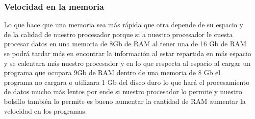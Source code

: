 \documentclass{article}
\begin{document}
\subsubsection{Velocidad en la memoria}
Lo que hace que una memoria sea más rápida que otra depende de su espacio y de la calidad de nuestro procesador porque si a nuestro procesador le cuesta procesar datos en una memoria de 8Gb de RAM al tener una de 16 Gb de RAM se podrá tardar más en encontrar la información al estar repartida en más espacio y se calentara más nuestro procesador y en lo que respecta al espacio al cargar un programa que ocupara 9Gb de RAM dentro de una memoria de 8 Gb el programa no cargara o utilizara 1 Gb del disco duro lo que hará el procesamiento de datos mucho más lentos por ende si nuestro procesador lo permite y nuestro bolsillo también lo permite es bueno aumentar la cantidad de RAM aumentar la velocidad en los programas.



\end{document}
